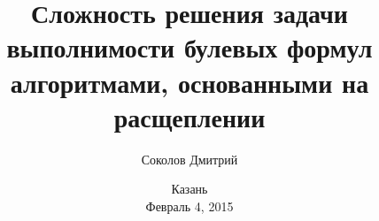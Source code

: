 

\title[\insertframenumber/\inserttotalframenumber~|~
Сложность решения задачи выполнимости]
{Сложность решения задачи выполнимости булевых формул алгоритмами, основанными на расщеплении}
\author[Соколов Д.]{Соколов Дмитрий}

\date{Казань\\
	Февраль 4, 2015}



	\maketitle

	
    
    



